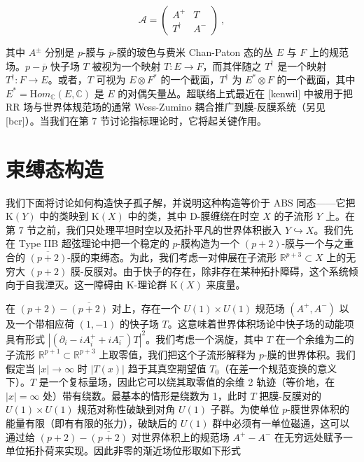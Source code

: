 \documentclass[11pt,a4paper]{ctexart}
\newcommand{\SrcRange}[2]{\marginpar{\raggedright\footnotesize 原文 p.#1}}
\begin{document}
\[{\mathcal A}=\left( \begin{array}{cc}A^+ & T\\ T^{\dagger} &A^-
\end{array}\right)\ ,\]

其中 \(A^\pm\) 分别是 \(p\)-膜与 \(\overline{p}\)-膜的玻色与费米 Chan-Paton 态的丛 \(E\) 与 \(F\) 上的规范场。\(p-\overline{p}\) 快子场 \(T\) 被视为一个映射 \(T:E\rightarrow F\)，而其伴随之 \(T^{\dagger}\) 是一个映射 \(T^{\dagger}: F\rightarrow E\)。或者，\(T\) 可视为 \(E\otimes F^*\) 的一个截面，\(T^{\dagger}\) 为 \(E^*\otimes F\) 的一个截面，其中 \(E^*={\mathrm Hom}_{\mathbb{C}}(E,\mathbb{C})\) 是 \(E\) 的对偶矢量丛。超联络上式最近在 [kenwil] 中被用于把 RR 场与世界体规范场的通常 Wess-Zumino 耦合推广到膜-反膜系统（另见 [bcr]）。当我们在第 7 节讨论指标理论时，它将起关键作用。

\SrcRange{37}{37}
\section{束缚态构造}\label{ux675fux7f1aux6001ux6784ux9020}

我们下面将讨论如何构造快子孤子解，并说明这种构造等价于 ABS 同态------它把 \({\mathrm K}(Y)\) 中的类映到 \({\mathrm K}(X)\) 中的类，其中 D-膜缠绕在时空 \(X\) 的子流形 \(Y\) 上。在第 7 节之前，我们只处理平坦时空以及拓扑平凡的世界体积嵌入 \(Y\hookrightarrow X\)。我们先在 Type IIB 超弦理论中把一个稳定的 \(p\)-膜构造为一个 \((p+2)\)-膜与一个与之重合的 \(\overline{(p+2)}\)-膜的束缚态。为此，我们考虑一对伸展在子流形 \({\mathbb{R}}^{p+3}\subset X\) 上的无穷大 \((p+2)\) 膜-反膜对。由于快子的存在，除非存在某种拓扑障碍，这个系统倾向于自我湮灭。这一障碍由 K-理论群 \({\mathrm K}(X)\) 来度量。

在 \((p+2)-\overline{(p+2)}\) 对上，存在一个 \(U(1)\times U(1)\) 规范场 \((A^+,A^-)\) 以及一个带相应荷 \((1,-1)\) 的快子场 \(T\)。这意味着世界体积场论中快子场的动能项具有形式 \(|(\partial_i-iA_i^++iA_i^-)T|^2\)。我们考虑一个涡旋，其中 \(T\) 在一个余维为二的子流形 \({\mathbb{R}}^{p+1}\subset {\mathbb{R}}^{p+3}\) 上取零值，我们把这个子流形解释为 \(p\)-膜的世界体积。我们假定当 \(|x|\rightarrow \infty\) 时 \(|T(x)|\) 趋于其真空期望值 \(T_0\)（在差一个规范变换的意义下）。\(T\) 是一个复标量场，因此它可以绕其取零值的余维 2 轨迹（等价地，在 \(|x|=\infty\) 处）带有绕数。最基本的情形是绕数为 1，此时 \(T\) 把膜-反膜对的 \(U(1)\times U(1)\) 规范对称性破缺到对角 \(U(1)\) 子群。为使单位 \(p\)-膜世界体积的能量有限（即有有限的张力），破缺后的 \(U(1)\) 群中必须有一单位磁通，这可以通过给 \((p+2)-\overline{(p+2)}\) 对世界体积上的规范场 \(A^+-A^-\) 在无穷远处赋予一单位拓扑荷来实现。因此非零的渐近场位形取如下形式
\end{document}
